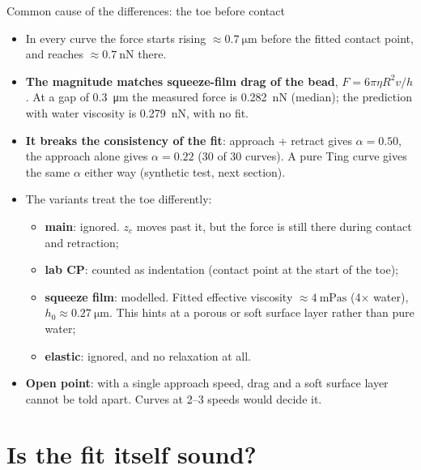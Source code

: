 \documentclass[aspectratio=169,9pt]{beamer}
\begin{document}
\begin{frame}{Common cause of the differences: the toe before contact}
\small
\begin{itemize}
\item In every curve the force starts rising $\approx\SI{0.7}{\micro\metre}$ before the fitted contact point, and reaches $\approx\SI{0.7}{\nano\newton}$ there.
\item \textbf{The magnitude matches squeeze-film drag of the bead}, $F=6\pi\eta R^2 v/h$. At a gap of \SI{0.3}{\micro\metre} the measured force is \SI{0.282}{\nano\newton} (median); the prediction with water viscosity is \SI{0.279}{\nano\newton}, with no fit.
\item \textbf{It breaks the consistency of the fit}: approach + retract gives $\alpha=0.50$, the approach alone gives $\alpha=0.22$ (30 of 30 curves). A pure Ting curve gives the same $\alpha$ either way (synthetic test, next section).
\item The variants treat the toe differently:
 \begin{itemize}
 \item \textbf{main}: ignored. $z_c$ moves past it, but the force is still there during contact and retraction;
 \item \textbf{lab CP}: counted as indentation (contact point at the start of the toe);
 \item \textbf{squeeze film}: modelled. Fitted effective viscosity $\approx\SI{4}{\milli\pascal\second}$ (4$\times$ water), $h_0\approx\SI{0.27}{\micro\metre}$. This hints at a porous or soft surface layer rather than pure water;
 \item \textbf{elastic}: ignored, and no relaxation at all.
 \end{itemize}
\item \textbf{Open point}: with a single approach speed, drag and a soft surface layer cannot be told apart. Curves at 2--3 speeds would decide it.
\end{itemize}
\end{frame}

\section{Is the fit itself sound?}
\end{document}
